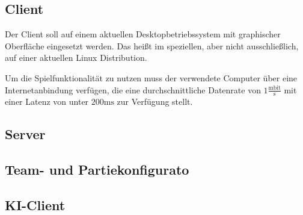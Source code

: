\subsection{Client}
Der Client soll auf einem aktuellen Desktopbetriebssystem mit graphischer Oberfläche eingesetzt werden. Das heißt im speziellen, aber nicht ausschließlich, auf einer aktuellen Linux Distribution.

Um die Spielfunktionalität zu nutzen muss der verwendete Computer über eine Internetanbindung verfügen, die eine durchschnittliche Datenrate von $1 \frac{\text{mbit}}{\text{s}}$ mit einer Latenz von unter $200\text{ms}$ zur Verfügung stellt. 

\subsection{Server}

\subsection{Team- und Partiekonfigurato}

\subsection{KI-Client}

